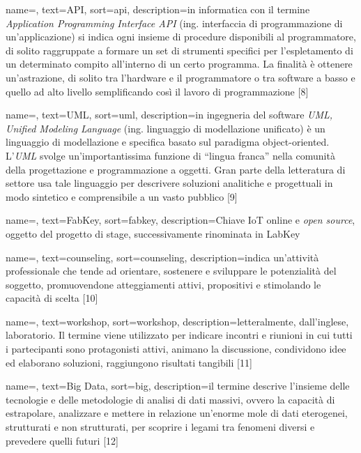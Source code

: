 \renewcommand{\glossaryname}{Glossario}

{
    name=,
    text=API,
    sort=api,
    description={in informatica con il termine \emph{Application Programming Interface API} (ing. interfaccia di programmazione di un'applicazione) si indica ogni insieme di procedure disponibili al programmatore, di solito raggruppate a formare un set di strumenti specifici per l'espletamento di un determinato compito all'interno di un certo programma. La finalità è ottenere un'astrazione, di solito tra l'hardware e il programmatore o tra software a basso e quello ad alto livello semplificando così il lavoro di programmazione [8]}
}

{
    name=,
    text=UML,
    sort=uml,
    description={in ingegneria del software \emph{UML, Unified Modeling Language} (ing. linguaggio di modellazione unificato) è un linguaggio di modellazione e specifica basato sul paradigma object-oriented. L'\emph{UML} svolge un'importantissima funzione di ``lingua franca'' nella comunità della progettazione e programmazione a oggetti. Gran parte della letteratura di settore usa tale linguaggio per descrivere soluzioni analitiche e progettuali in modo sintetico e comprensibile a un vasto pubblico [9]}
}

{
    name=,
    text=FabKey,
    sort=fabkey,
    description={Chiave IoT online e \textit{open source}, oggetto del progetto di stage, successivamente rinominata in LabKey}
}

{
	name=,
    text=counseling,
    sort=counseling,
    description={indica un'attività professionale che tende ad orientare, sostenere e sviluppare le potenzialità del soggetto, promuovendone atteggiamenti attivi, propositivi e stimolando le capacità di scelta [10]}
}

{
	name=,
    text=workshop,
    sort=workshop,
    description={letteralmente, dall'inglese, laboratorio. Il termine viene utilizzato per indicare incontri e riunioni in cui tutti i partecipanti sono protagonisti attivi, animano la discussione, condividono idee ed elaborano soluzioni, raggiungono risultati tangibili [11]}
}

{
	name=,
    text=Big Data,
    sort=big,
    description={il termine descrive l'insieme delle tecnologie e delle metodologie di analisi di dati massivi, ovvero la capacità di estrapolare, analizzare e mettere in relazione un'enorme mole di dati eterogenei, strutturati e non strutturati, per scoprire i legami tra fenomeni diversi e prevedere quelli futuri [12]}
}

